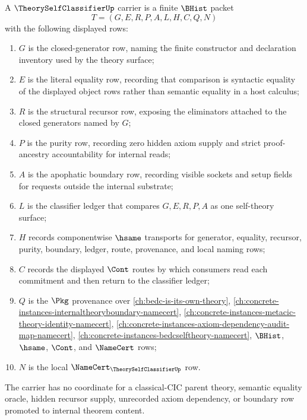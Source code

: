 \begin{definition}
\label{def:theory-self-classifier-carrier}
A $\TheorySelfClassifierUp$ carrier is a finite $\BHist$ packet
$$
T=(G,E,R,P,A,L,H,C,Q,N)
$$
with the following displayed rows:
\begin{enumerate}
\item $G$ is the closed-generator row, naming the finite constructor and declaration inventory used by the theory surface;
\item $E$ is the literal equality row, recording that comparison is syntactic equality of the displayed object rows rather than semantic equality in a host calculus;
\item $R$ is the structural recursor row, exposing the eliminators attached to the closed generators named by $G$;
\item $P$ is the purity row, recording zero hidden axiom supply and strict proof-ancestry accountability for internal reads;
\item $A$ is the apophatic boundary row, recording visible sockets and setup fields for requests outside the internal substrate;
\item $L$ is the classifier ledger that compares $G,E,R,P,A$ as one self-theory surface;
\item $H$ records componentwise $\hsame$ transports for generator, equality, recursor, purity, boundary, ledger, route, provenance, and local naming rows;
\item $C$ records the displayed $\Cont$ routes by which consumers read each commitment and then return to the classifier ledger;
\item $Q$ is the $\Pkg$ provenance over \autoref{ch:bedc-is-its-own-theory}, \autoref{ch:concrete-instances-internaltheoryboundary-namecert}, \autoref{ch:concrete-instances-metacic-theory-identity-namecert}, \autoref{ch:concrete-instances-axiom-dependency-audit-map-namecert}, \autoref{ch:concrete-instances-bedcselftheory-namecert}, $\BHist$, $\hsame$, $\Cont$, and $\NameCert$ rows;
\item $N$ is the local $\NameCert_{\TheorySelfClassifierUp}$ row.
\end{enumerate}
The carrier has no coordinate for a classical-CIC parent theory, semantic equality oracle, hidden recursor supply, unrecorded axiom dependency, or boundary row promoted to internal theorem content.
\end{definition}

